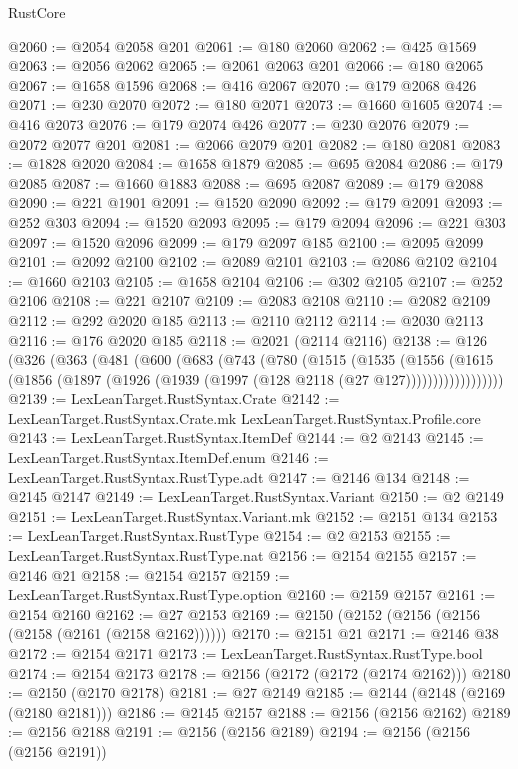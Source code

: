 \begin{lexlean}{RustCore}
\begin{coremodule}
@2060 := @2054 @2058 @201
@2061 := @180 @2060
@2062 := @425 @1569
@2063 := @2056 @2062
@2065 := @2061 @2063 @201
@2066 := @180 @2065
@2067 := @1658 @1596
@2068 := @416 @2067
@2070 := @179 @2068 @426
@2071 := @230 @2070
@2072 := @180 @2071
@2073 := @1660 @1605
@2074 := @416 @2073
@2076 := @179 @2074 @426
@2077 := @230 @2076
@2079 := @2072 @2077 @201
@2081 := @2066 @2079 @201
@2082 := @180 @2081
@2083 := @1828 @2020
@2084 := @1658 @1879
@2085 := @695 @2084
@2086 := @179 @2085
@2087 := @1660 @1883
@2088 := @695 @2087
@2089 := @179 @2088
@2090 := @221 @1901
@2091 := @1520 @2090
@2092 := @179 @2091
@2093 := @252 @303
@2094 := @1520 @2093
@2095 := @179 @2094
@2096 := @221 @303
@2097 := @1520 @2096
@2099 := @179 @2097 @185
@2100 := @2095 @2099
@2101 := @2092 @2100
@2102 := @2089 @2101
@2103 := @2086 @2102
@2104 := @1660 @2103
@2105 := @1658 @2104
@2106 := @302 @2105
@2107 := @252 @2106
@2108 := @221 @2107
@2109 := @2083 @2108
@2110 := @2082 @2109
@2112 := @292 @2020 @185
@2113 := @2110 @2112
@2114 := @2030 @2113
@2116 := @176 @2020 @185
@2118 := @2021 (@2114 @2116)
@2138 := @126
    (@326
      (@363
        (@481
          (@600
            (@683
              (@743
                (@780
                  (@1515
                    (@1535
                      (@1556
                        (@1615
                          (@1856 (@1897 (@1926 (@1939 (@1997 (@128 @2118 (@27 @127))))))))))))))))))
@2139 := LexLeanTarget.RustSyntax.Crate
@2142 := LexLeanTarget.RustSyntax.Crate.mk LexLeanTarget.RustSyntax.Profile.core
@2143 := LexLeanTarget.RustSyntax.ItemDef
@2144 := @2 @2143
@2145 := LexLeanTarget.RustSyntax.ItemDef.enum
@2146 := LexLeanTarget.RustSyntax.RustType.adt
@2147 := @2146 @134
@2148 := @2145 @2147
@2149 := LexLeanTarget.RustSyntax.Variant
@2150 := @2 @2149
@2151 := LexLeanTarget.RustSyntax.Variant.mk
@2152 := @2151 @134
@2153 := LexLeanTarget.RustSyntax.RustType
@2154 := @2 @2153
@2155 := LexLeanTarget.RustSyntax.RustType.nat
@2156 := @2154 @2155
@2157 := @2146 @21
@2158 := @2154 @2157
@2159 := LexLeanTarget.RustSyntax.RustType.option
@2160 := @2159 @2157
@2161 := @2154 @2160
@2162 := @27 @2153
@2169 := @2150 (@2152 (@2156 (@2156 (@2158 (@2161 (@2158 @2162))))))
@2170 := @2151 @21
@2171 := @2146 @38
@2172 := @2154 @2171
@2173 := LexLeanTarget.RustSyntax.RustType.bool
@2174 := @2154 @2173
@2178 := @2156 (@2172 (@2172 (@2174 @2162)))
@2180 := @2150 (@2170 @2178)
@2181 := @27 @2149
@2185 := @2144 (@2148 (@2169 (@2180 @2181)))
@2186 := @2145 @2157
@2188 := @2156 (@2156 @2162)
@2189 := @2156 @2188
@2191 := @2156 (@2156 @2189)
@2194 := @2156 (@2156 (@2156 @2191))

\end{coremodule}
\end{lexlean}
